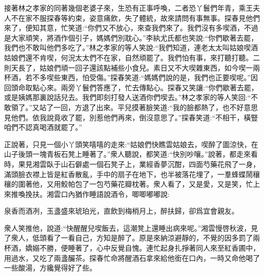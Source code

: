 \begin{parag}
    接著林之孝家的同著幾個老婆子來，生恐有正事呼喚，二者恐丫鬟們年青，乘王夫人不在家不服探春等約束，姿意痛飲，失了體統，故來請問有事無事。探春見他們來了，便知其意，忙笑道:“你們又不放心，來查我們來了。我們沒有多喫酒，不過是大家頑笑，將酒作個引子，媽媽們別耽心。”李紈尤氏都也笑說:“你們歇著去罷，我們也不敢叫他們多吃了。”林之孝家的等人笑說:“我們知道，連老太太叫姑娘喫酒姑娘們還不肯喫，何況太太們不在家，自然頑罷了。我們怕有事，來打聽打聽。二則天長了，姑娘們頑一回子還該點補些小食兒。素日又不大喫雜東西，如今喫一兩杯酒，若不多喫些東西，怕受傷。”探春笑道:“媽媽們說的是，我們也正要喫呢。”因回頭命取點心來。兩旁丫鬟們答應了，忙去傳點心。探春又笑讓:“你們歇著去罷，或是姨媽那裏說話兒去。我們即刻打發人送酒你們喫去。”林之孝家的等人笑回:“不敢領了。”又站了一回，方退了出來。平兒摸著臉笑道:“我的臉都熱了，也不好意思見他們。依我說竟收了罷，別惹他們再來，倒沒意思了。”探春笑道:“不相干，橫豎咱們不認真喝酒就罷了。”
\end{parag}


\begin{parag}
    正說著，只見一個小丫頭笑嘻嘻的走來:“姑娘們快瞧雲姑娘去，喫醉了圖涼快，在山子後頭一塊青板石凳上睡著了。”衆人聽說，都笑道:“快別吵嚷。”說著，都走來看時，果見湘雲臥于山石僻處一個石凳子上，業經香夢沉酣，四面芍藥花飛了一身，滿頭臉衣襟上皆是紅香散亂，手中的扇子在地下，也半被落花埋了，一羣蜂蝶鬧穰穰的圍著他，又用鮫帕包了一包芍藥花瓣枕著。衆人看了，又是愛，又是笑，忙上來推喚挽扶。湘雲口內猶作睡語說酒令，唧唧嘟嘟說:
\end{parag}


\begin{poem}
    \begin{pl}泉香而酒冽，玉盞盛來琥珀光，直飲到梅梢月上，醉扶歸，卻爲宜會親友。\end{pl}
\end{poem}


\begin{parag}
    衆人笑推他，說道:“快醒醒兒喫飯去，這潮凳上還睡出病來呢。”湘雲慢啓秋波，見了衆人，低頭看了一看自己，方知是醉了。原是來納涼避靜的，不覺的因多罰了兩杯酒，嬌嫋不勝，便睡著了，心中反覺自愧。連忙起身扎掙著同人來至紅香圃中，用過水，又吃了兩盞釅茶。探春忙命將醒酒石拿來給他銜在口內，一時又命他喝了一些酸湯，方纔覺得好了些。
\end{parag}



